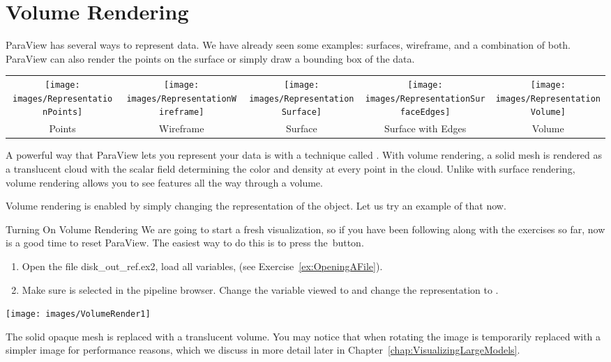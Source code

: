 \section{Volume Rendering}

ParaView has several ways to represent data.  We have already seen some
examples: surfaces, wireframe, and a combination of both.  ParaView can
also render the points on the surface or simply draw a bounding box of the
data.

\begin{inlinefig}
  \begin{tabular}{c@{\;}c@{\;}c@{\;}c@{\;}c}
    \texttt{[image: images/RepresentationPoints]} &
    \texttt{[image: images/RepresentationWireframe]} &
    \texttt{[image: images/RepresentationSurface]} &
    \texttt{[image: images/RepresentationSurfaceEdges]} &
    \texttt{[image: images/RepresentationVolume]}
    \\
    Points &
    Wireframe &
    Surface &
    \parbox[t]{.18\linewidth}{\centering{}Surface with Edges} &
    Volume
  \end{tabular}
\end{inlinefig}

A powerful way that ParaView lets you represent your data is with a
technique called .  With volume rendering, a
solid mesh is rendered as a translucent cloud with the scalar field
determining the color and density at every point in the cloud.  Unlike with
surface rendering, volume rendering allows you to see features all the way
through a volume.

Volume rendering is enabled by simply changing the representation of the
object.  Let us try an example of that now.

\begin{exercise}{Turning On Volume Rendering}
  \label{ex:VolumeRendering}%
  We are going to start a fresh visualization, so if you have been
  following along with the exercises so far, now is a good time to reset
  ParaView.  The easiest way to do this is to press the~\disconnect button.

  \begin{enumerate}
  \item Open the file disk\_out\_ref.ex2, load all variables, \apply (see
    Exercise~\ref{ex:OpeningAFile}).
  \item Make sure  is selected in the pipeline
    browser.  Change the variable viewed to  and change the
    representation to .
  \end{enumerate}

  \begin{inlinefig}
    \texttt{[image: images/VolumeRender1]}
  \end{inlinefig}

  The solid opaque mesh is replaced with a translucent volume. You may
  notice that when rotating the image is temporarily replaced with a
  simpler image for performance reasons, which we discuss
  in more detail later in Chapter~\ref{chap:VisualizingLargeModels}.
\end{exercise}

